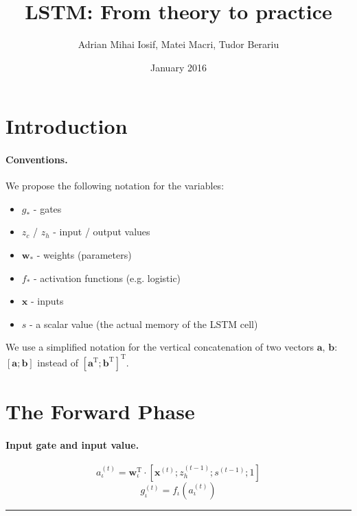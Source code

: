 \documentclass[11pt]{article}
\title{LSTM: From theory to practice}
\author{Adrian Mihai Iosif, Matei Macri, Tudor Berariu}
\date{January 2016}
\begin{document}
\maketitle

\section{Introduction}

\paragraph{Conventions.} We propose the following notation for the variables:
\begin{itemize}
    \item $g_{*}$ - gates
    \item $z_{c}$ / $z_h$ - input / output values
    \item $\mathbf{w}_{*}$ - weights (parameters)
    \item $f_{*}$ - activation functions (e.g. logistic)
    \item $\mathbf{x}$ - inputs
    \item $s$ - a scalar value (the actual memory of the LSTM cell)
\end{itemize}

We use a simplified notation for the vertical concatenation of two vectors $\mathbf{a}$, $\mathbf{b}$: $\left[\mathbf{a}; \mathbf{b}\right]$ instead of $\left[ \mathbf{a}^{\text{T}} ; \mathbf{b}^{\text{T}} \right]^{\text{T}}$.

\begin{center}

\end{center}

\section{The Forward Phase}

\paragraph{Input gate and input value.}

$$a_{\iota}^{(t)} = \mathbf{w}_{\iota}^{\text{T}} \cdot \left[\mathbf{x}^{(t)}; z_{h}^{(t-1)}; s^{(t-1)}; 1\right]$$
$$g_{\iota}^{(t)} = f_{\iota}\left(a_{\iota}^{(t)}\right)$$

\begin{center}\rule[0.5ex]{.3\linewidth}{1pt}\end{center}
\end{document}
